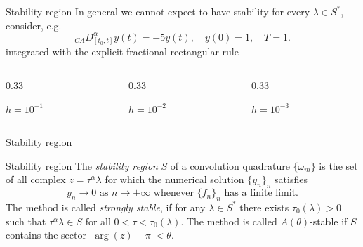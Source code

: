 \documentclass[aspectratio=169,xcolor=dvipsnames]{beamer}
\begin{document}
\begin{frame}{Stability region}
In general we cannot expect to have stability for every $\lambda \in S^*$, consider, e.g.
\[
{}_{CA} D_{[t_0,t]}^\alpha y(t) = - 5 y(t), \quad y(0) = 1, \quad T = 1. 
\]  
integrated with the explicit fractional rectangular rule
\begin{columns}
\begin{column}{0.33\columnwidth}
\centering



$h = 10^{-1}$\vfill
\end{column}
\begin{column}{0.33\columnwidth}
\centering



$h = 10^{-2}$\vfill
\end{column}
\begin{column}{0.33\columnwidth}
\centering



$h = 10^{-3}$\vfill
\end{column}
\end{columns}
\end{frame}

\begin{frame}{Stability region}
\begin{block}{Stability region}
The \emph{stability region} $S$ of a convolution quadrature $\{\omega_m\}$ is the set of all complex $z = \tau^\alpha \lambda$ for which the numerical solution $\{y_n\}_n$ satisfies
\[
y_n \rightarrow 0 \text{ as } n \rightarrow + \infty \text{ whenever }\{f_n\}_n\text{ has a finite limit}.
\]
The method is called \emph{strongly stable}, if for any $\lambda \in S^*$ there exists $\tau_0(\lambda) > 0$ such that $\tau^\alpha \lambda \in S$ for all $0 < \tau < \tau_0(\lambda)$. The method is called $A(\theta)$-stable if $S$ contains the sector $|\arg(z)-\pi| < \theta$. 
\end{block}


\end{frame}
\end{document}
